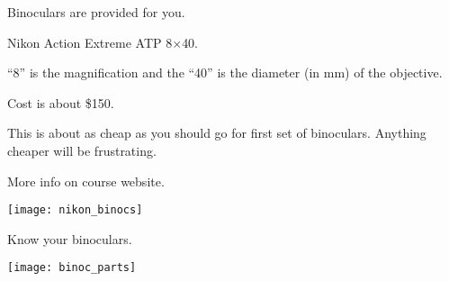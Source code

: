 \documentclass[t]{beamer}
\begin{document}
{
\begin{frame}[t,plain]{Binoculars are provided for you.}


\begin{multicols}{2}
Nikon Action Extreme ATP 8$\times$40.

\smallskip

“8” is the magnification and the “40” is the diameter (in mm) of the objective.

\smallskip

Cost is about \$150.

\smallskip

This is about as cheap as you should go for first set of binoculars. Anything cheaper will be frustrating.

\smallskip

More info on course website.

\columnbreak

\texttt{[image: nikon\_binocs]}

\end{multicols}
%
%

\end{frame}
}

{
\begin{frame}[t,plain]{Know your binoculars.}

\texttt{[image: binoc\_parts]}

\end{frame}
}
\end{document}
